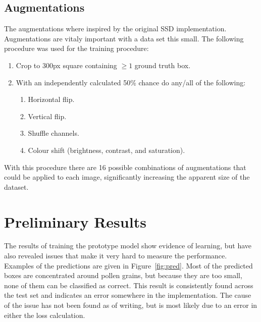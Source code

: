 \subsection{Augmentations}
The augmentations where inspired by the original SSD implementation.
Augmentations are vitaly important with a data set this small.
The following procedure was used for the training procedure:
\begin{enumerate}
  \item Crop to 300px square containing \( \geq 1 \) ground truth box.
  \item With an independently calculated 50\% chance do any/all of the following:
  \begin{enumerate}
  \item Horizontal flip.
  \item Vertical flip.
  \item Shuffle channels.
  \item Colour shift (brightness, contrast, and saturation).
  \end{enumerate}
\end{enumerate}

With this procedure there are 16 possible combinations of augmentations that could be applied to each image, significantly increasing the apparent size of the dataset.

\section{Preliminary Results}
The results of training the prototype model show evidence of learning, but have also revealed issues that make it very hard to measure the performance.
Examples of the predictions are given in Figure~\ref{fig:pred}.
Most of the predicted boxes are concentrated around pollen grains, but because they are too small, none of them can be classified as correct.
This result is consistently found across the test set and indicates an error somewhere in the implementation.
The cause of the issue has not been found as of writing, but is most likely due to an error in either the loss calculation.

